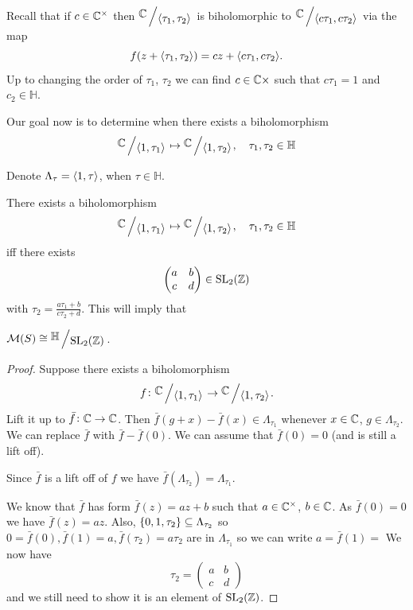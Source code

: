 \documentclass[11pt,a4paper]{article}
\renewcommand{\H}{\mathbb H}
\begin{document}
Recall that if $c \in \mathbb{C}^{\times}$ then $\bigslant{\C}{\ip{\tau_1}{\tau_2}}$
is biholomorphic to $\bigslant{\C}{\ip{c \tau_1}{c \tau_2}}$ via the map
\[
  f(z + \langle \tau_1, \tau_2 \rangle) = cz + \langle c \tau_1, c \tau_2 \rangle.
\]
Up to changing the order of $\tau_1$, $\tau_2$ we can find $c \in \mathbb{C}{\times}$
such that $c \tau_1 = 1$ and $c_2 \in \H$.

Our goal now is to determine when there exists a biholomorphism
\[
  \bigslant{\C}{\ip{1}{\tau_1}} \mapsto
  \bigslant{\C}{\ip{1}{\tau_2}}, \quad \tau_1,\tau_2 \in \H
\]

Denote $\Lambda_{\tau} = \langle 1, \tau \rangle$, when $\tau \in \H$.

\begin{theorem}
There exists a biholomorphism
\[
  \bigslant{\C}{\ip{1}{\tau_1}} \mapsto
  \bigslant{\C}{\ip{1}{\tau_2}}, \quad \tau_1,\tau_2 \in \H
\]
iff there exists 
\[
  \begin{pmatrix}
    a & b \\
    c & d
  \end{pmatrix} \in \operatorname{SL}_2(\mathbb{Z})
\]
with $\tau_2= \frac{a \tau_1 + b}{c \tau_2 + d}$.
This will imply that \item $\M(S) \cong \bigslant{\H}{\SL_2(\Z)}$.
\end{theorem}
\begin{proof}
  Suppose there exists a biholomorphism 
  \[
    f \colon \bigslant{\C}{\ip{1}{\tau_1}} \to
    \bigslant{\C}{\ip{1}{\tau_2}}.
  \]
  Lift it up to $\bar f \colon \mathbb{C} \to \mathbb{C}$.
  Then $\bar f(g + x) - \bar f(x) \in \Lambda_{\tau_1}$
  whenever $x \in \mathbb{C}$, $g \in \Lambda_{\tau_2}$.
  We can replace $\bar f$ with $\bar f - \bar f(0)$.
  We can assume that $\bar f(0) = 0$ (and is still a lift off).
  \begin{remark}
    Since $\bar f$ is a lift off of $f$ we have 
    $\bar f(\Lambda_{\tau_2}) = \Lambda_{\tau_1}$.
  \end{remark}
  We know that $\bar f$ has form $\bar f(z) = a z + b$ such that
  $a \in \mathbb{C}^{\times}$, $b \in \mathbb{C}$.
  As $\bar f(0) = 0$ we have $\bar f(z) = a z$.
  Also, $\set{0,1,\tau_2} \subseteq \Lambda_{\tau_2}$ so 
  $0 = \bar f(0), \bar f(1) = a, \bar f(\tau_2) = a \tau_2$ are in
  $\Lambda_{\tau_1}$ so we can write $a = \bar f(1) = $
  We now have
  \[
    \tau_2 =
    \begin{pmatrix}
      a & b \\
      c & d
    \end{pmatrix}
  \]
  and we still need to show it is an element of $\operatorname{SL}_2(\mathbb{Z})$.
\end{proof}
\end{document}
